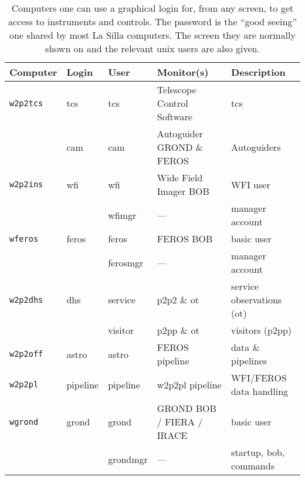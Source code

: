 \documentclass[11pt,fleqn]{book} %
\begin{document}
\begin{table}
    \caption[Main workstations and users]{Computers one can use a graphical login for, from any screen, to get access to instruments and controls.  The password is the ``good seeing'' one shared by most  La Silla computers. The screen they are normally shown on and the relevant unix users are also given.  }
\label{fig:computers}
\centering
\begin{tabular}{lllll}
\hline
Computer         & Login    & User     & Monitor(s)                 & Description\\\hline\hline
\texttt{w2p2tcs} & tcs      & tcs      & Telescope Control Software & \gls{tcs}\\
                 & cam      & cam      & Autoguider GROND \& FEROS  & Autoguiders\\
\texttt{w2p2ins} & wfi      & wfi      & Wide Field Imager BOB      & WFI user\\
                 &          & wfimgr   & ---                        & manager account\\
\texttt{wferos}  & feros    & feros    & FEROS BOB                  & basic user\\
                 &          & ferosmgr & ---                        & manager account\\
\texttt{w2p2dhs} & dhs      & service  & p2p2 \& ot                 & service observations (ot)\\
                 &          & visitor  & p2pp \& ot                 & visitors (p2pp)\\
\texttt{w2p2off} & astro    & astro    & FEROS pipeline             & data \& pipelines\\
\texttt{w2p2pl}  & pipeline & pipeline & w2p2pl pipeline            & WFI/FEROS data handling\\       
\texttt{wgrond}  & grond    & grond    & GROND BOB / FIERA / IRACE  & basic user\\
                 &          & grondmgr & ---                        & startup, \gls{bob}, commands\\
\hline
\end{tabular}
\end{table}
\end{document}
